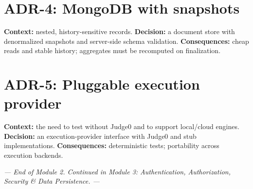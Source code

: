 \documentclass[12pt,a4paper,oneside]{report}
\begin{document}
\section{ADR-4: MongoDB with snapshots}
\textbf{Context:} nested, history-sensitive records. \textbf{Decision:} a
document store with denormalized snapshots and server-side schema validation.
\textbf{Consequences:} cheap reads and stable history; aggregates must be
recomputed on finalization.

\section{ADR-5: Pluggable execution provider}
\textbf{Context:} the need to test without Judge0 and to support local/cloud
engines. \textbf{Decision:} an execution-provider interface with Judge0 and stub
implementations. \textbf{Consequences:} deterministic tests; portability across
execution backends.

\vspace{0.6cm}
\begin{center}
\textit{--- End of Module 2. Continued in Module 3: Authentication, Authorization, Security \& Data Persistence. ---}
\end{center}
\end{document}
